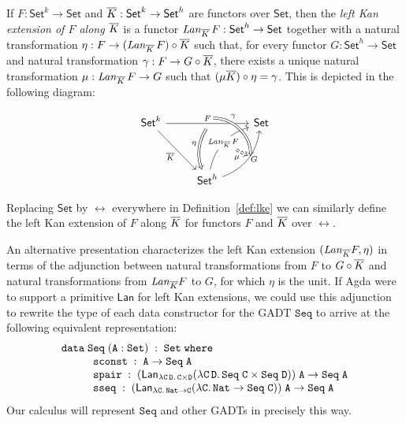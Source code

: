 \documentclass{lmcs}
\theoremstyle{plain}\newtheorem{satz}[thm]{Satz}
\newcommand{\set}{\mathsf{Set}}
\begin{document}
\begin{defi}\label{def:lke}
If $F : \set^k \to \set$ and $\ol{K} : \set^k \to \set^h$ are functors
over $\set$, then the {\em left Kan extension of $F$ along $\overline{K}$} is
a functor $\mathit{Lan}_{\ol K}\,F : \set^h \to \set$ together with a
natural transformation $\eta : F \to (\mathit{Lan}_{\overline{K}}\,F)
\circ \overline{K}$
such that, for every functor $G : \set^h \to \set$ and natural
transformation $\gamma : F \to G \circ \overline{K}$, there exists a unique
natural transformation $\mu : \mathit{Lan}_{\overline{K}}\,F \to G$ such that
$(\mu {\overline{K}}) \circ \eta = \gamma$. This is depicted in the
following diagram:

\vspace*{-0.05in}

\[
\begin{tikzcd}[row sep = huge]
\set^k
\ar[rr, "{F}"{name=Fa, above}, ""{name=F, below}]
\ar[rd, "{\ol K}"']
&& \set \\
& \set^h
\ar[Rightarrow, bend right = 25, from=F, "{\eta}"']
\ar[ur, bend left, "{\mathit{Lan}_{\ol K}\,F}"{name=Lan, description}]
\ar[ur, bend right, "{G}"'{name=L, right}, ""'{name=Lr, right}]
\ar[Rightarrow, bend left = 45, from=Fa, to=Lr, "{\gamma}" near start]
\ar[Rightarrow, dashed, from=Lan, to=L, "{\mu}"']
\end{tikzcd}
\]

\vspace*{0.05in}

\noindent
Replacing $\set$ by $\rel$ everywhere in Definition~\ref{def:lke} we
can similarly define the left Kan extension of $F$ along $\overline{K}$ for
functors $F$ and $\overline{K}$ over $\rel$.
\end{defi}

An alternative presentation characterizes the left Kan extension
$(\mathit{Lan}_{\overline{K}} F, \eta)$ in terms of the adjunction between
natural transformations from $F$ to $G \circ \overline{K}$ and natural
transformations from $\mathit{Lan}_{\overline{K}} F$ to $G$, for which
$\eta$ is the unit. If Agda were to support a primitive
$\mathsf{Lan}$ for left Kan extensions, we could use this adjunction
to rewrite the type of each data constructor for the GADT
$\mathtt{Seq}$ to arrive at the following equivalent representation:
{\small
\[\begin{array}{l}
\mathtt{data\; Seq \;(A : Set)\;:\;Set\;where}\\
\hspace*{0.4in}\mathtt{sconst\;:\; A \rightarrow Seq\;A}\\
\hspace*{0.4in}\mathtt{spair\;:\;(\mathsf{Lan}_{\lambda C\,D.\,C \times D}
  (\lambda C\,D.\,Seq\;C\times Seq\;D))\;A \rightarrow Seq\;A}\\ 
\hspace*{0.4in}\mathtt{sseq\;:\;(\mathsf{Lan}_{\lambda C.\,Nat \to C}
  (\lambda C.\,Nat \rightarrow Seq\;C))\;A \rightarrow
  Seq\;A}
\end{array}\]}
\noindent
\!\!Our calculus will represent $\mathtt{Seq}$ and other GADTs in
precisely this way.
\end{document}
